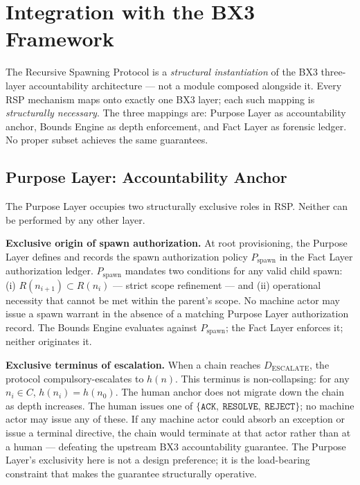 \section{Integration with the BX3 Framework}
\label{sec:rs-integration}

The Recursive Spawning Protocol is a \emph{structural instantiation} of the BX3 three-layer accountability architecture — not a module composed alongside it. Every RSP mechanism maps onto exactly one BX3 layer; each such mapping is \emph{structurally necessary}. The three mappings are: Purpose Layer as accountability anchor, Bounds Engine as depth enforcement, and Fact Layer as forensic ledger. No proper subset achieves the same guarantees.

\subsection{Purpose Layer: Accountability Anchor}
\label{sec:rs-purpose-anchor}

The Purpose Layer occupies two structurally exclusive roles in RSP. Neither can be performed by any other layer.

\medskip
\noindent\textbf{Exclusive origin of spawn authorization.} At root provisioning, the Purpose Layer defines and records the spawn authorization policy $P_{\mathrm{spawn}}$ in the Fact Layer authorization ledger. $P_{\mathrm{spawn}}$ mandates two conditions for any valid child spawn: (i) $R(n_{i+1}) \subset R(n_i)$ — strict scope refinement — and (ii) operational necessity that cannot be met within the parent's scope. No machine actor may issue a spawn warrant in the absence of a matching Purpose Layer authorization record. The Bounds Engine evaluates against $P_{\mathrm{spawn}}$; the Fact Layer enforces it; neither originates it.

\medskip
\noindent\textbf{Exclusive terminus of escalation.} When a chain reaches $D_{\mathrm{ESCALATE}}$, the protocol compulsory-escalates to $h(n)$. This terminus is non-collapsing: for any $n_i \in C$, $h(n_i) = h(n_0)$. The human anchor does not migrate down the chain as depth increases. The human issues one of $\{\texttt{ACK},\ \texttt{RESOLVE},\ \texttt{REJECT}\}$; no machine actor may issue any of these. If any machine actor could absorb an exception or issue a terminal directive, the chain would terminate at that actor rather than at a human — defeating the upstream BX3 accountability guarantee. The Purpose Layer's exclusivity here is not a design preference; it is the load-bearing constraint that makes the guarantee structurally operative.

